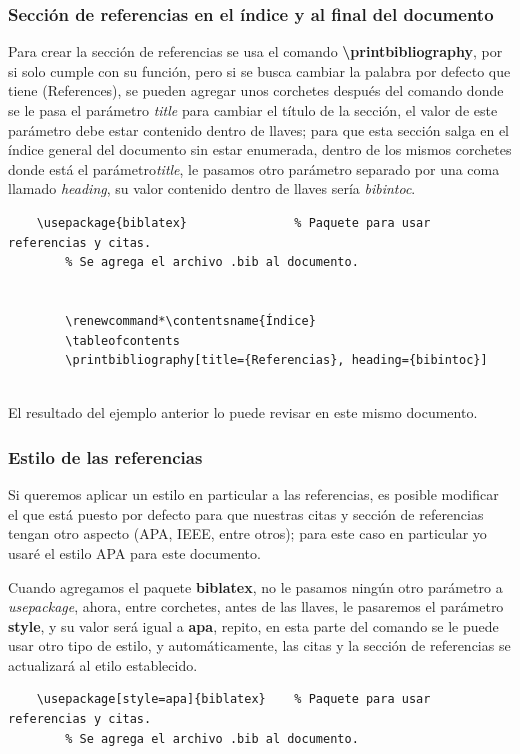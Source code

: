 \subsubsection{Sección de referencias en el índice y al final del documento}
\hspace{0.55cm}Para crear la sección de referencias se usa el comando \textbf{\textbackslash{printbibliography}}, por si solo cumple con su función, pero si se busca cambiar la palabra por defecto que tiene (References), se pueden agregar unos corchetes después del comando donde se le pasa el parámetro \textit{title} para cambiar el título de la sección, el valor de este parámetro debe estar contenido dentro de llaves; para que esta sección salga en el índice general del documento sin estar enumerada, dentro de los mismos corchetes donde está el parámetro\textit{title}, le pasamos otro parámetro separado por una coma llamado \textit{heading}, su valor contenido dentro de llaves sería \textit{bibintoc}.
\begin{lstlisting}
    \usepackage{biblatex}	            % Paquete para usar referencias y citas.
    	% Se agrega el archivo .bib al documento.

    
        \renewcommand*\contentsname{Índice}
        \tableofcontents
        \printbibliography[title={Referencias}, heading={bibintoc}]
    
\end{lstlisting}

El resultado del ejemplo anterior lo puede revisar en este mismo documento.


\subsubsection{Estilo de las referencias}
\hspace{0.55cm}Si queremos aplicar un estilo en particular a las referencias, es posible modificar el que está puesto por defecto para que nuestras citas y sección de referencias tengan otro aspecto (APA, IEEE, entre otros); para este caso en particular yo usaré el estilo APA para este documento.

Cuando agregamos el paquete \textbf{biblatex}, no le pasamos ningún otro parámetro a \textit{usepackage}, ahora, entre corchetes, antes de las llaves, le pasaremos el parámetro \textbf{style}, y su valor será igual a \textbf{apa}, repito, en esta parte del comando se le puede usar otro tipo de estilo, y automáticamente, las citas y la sección de referencias se actualizará al etilo establecido.
\begin{lstlisting}
    \usepackage[style=apa]{biblatex}    % Paquete para usar referencias y citas.
    	% Se agrega el archivo .bib al documento.

    
        
    
\end{lstlisting}


